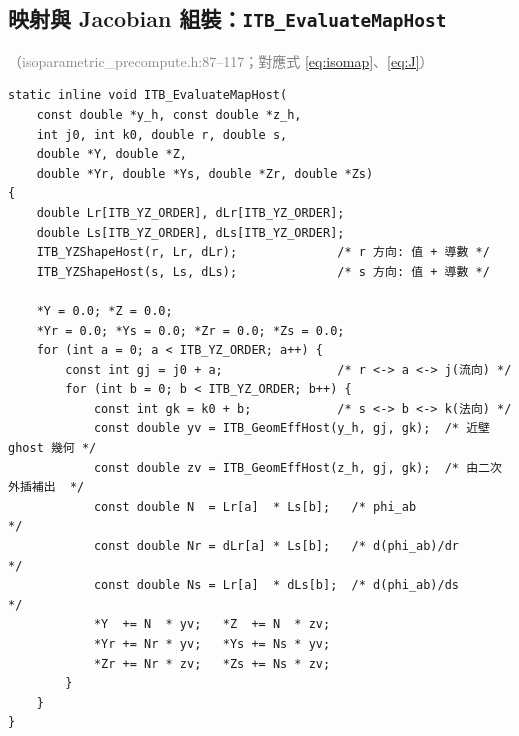 \documentclass[11pt,a4paper]{article}
\newcommand{\code}[1]{\texttt{#1}}
\newcommand{\filewhere}[1]{\textcolor{gray}{\small（#1）}}
\begin{document}
\subsection{映射與 Jacobian 組裝：\code{ITB\_EvaluateMapHost}}
\filewhere{isoparametric\_precompute.h:87--117；對應式 \eqref{eq:isomap}、\eqref{eq:J}}
\begin{lstlisting}[caption={張量積一次組裝 $Y,Z$ 與四個 Jacobian 分量（每次 Newton 迭代呼叫一次）}]
static inline void ITB_EvaluateMapHost(
    const double *y_h, const double *z_h,
    int j0, int k0, double r, double s,
    double *Y, double *Z,
    double *Yr, double *Ys, double *Zr, double *Zs)
{
    double Lr[ITB_YZ_ORDER], dLr[ITB_YZ_ORDER];
    double Ls[ITB_YZ_ORDER], dLs[ITB_YZ_ORDER];
    ITB_YZShapeHost(r, Lr, dLr);              /* r 方向: 值 + 導數 */
    ITB_YZShapeHost(s, Ls, dLs);              /* s 方向: 值 + 導數 */

    *Y = 0.0; *Z = 0.0;
    *Yr = 0.0; *Ys = 0.0; *Zr = 0.0; *Zs = 0.0;
    for (int a = 0; a < ITB_YZ_ORDER; a++) {
        const int gj = j0 + a;                /* r <-> a <-> j(流向) */
        for (int b = 0; b < ITB_YZ_ORDER; b++) {
            const int gk = k0 + b;            /* s <-> b <-> k(法向) */
            const double yv = ITB_GeomEffHost(y_h, gj, gk);  /* 近壁 ghost 幾何 */
            const double zv = ITB_GeomEffHost(z_h, gj, gk);  /* 由二次外插補出  */
            const double N  = Lr[a]  * Ls[b];   /* phi_ab            */
            const double Nr = dLr[a] * Ls[b];   /* d(phi_ab)/dr       */
            const double Ns = Lr[a]  * dLs[b];  /* d(phi_ab)/ds       */
            *Y  += N  * yv;   *Z  += N  * zv;
            *Yr += Nr * yv;   *Ys += Ns * yv;
            *Zr += Nr * zv;   *Zs += Ns * zv;
        }
    }
}
\end{lstlisting}
\end{document}
